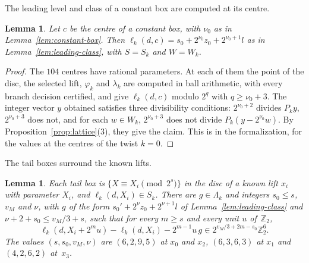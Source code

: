 \documentclass[11pt]{amsart}
\newtheorem{lemma}[theorem]{Lemma}
\theoremstyle{definition}
\numberwithin{equation}{section}
\newcommand{\Zt}{\mathbb{Z}_2}
\newcommand{\lean}[1]{\ignorespaces}
\begin{document}
The leading level and class of a constant box are computed at its centre.

\begin{lemma}\label{lem:centres}\lean{FurioLombardo.Discharge.M4Box.CentreData.hCe_0, FurioLombardo.M4.TwistChecks.centres, FurioLombardo.Discharge.M4Box.CentreData.hCe_1, FurioLombardo.M4.T0.centresMem, FurioLombardo.M4.T1.centresMem, FurioLombardo.Discharge.M4Box.lead_or_known_w}
Let $c$ be the centre of a constant box, with $\nu_0$ as in Lemma~\ref{lem:constant-box}. Then $\ell_k(d,c)=s_0+2^{\nu_0}z_0+2^{\nu_0+1}l$ as in Lemma~\ref{lem:leading-class}, with $S=S_k$ and $W=W_k$.
\end{lemma}

\begin{proof}
The $104$ centres have rational parameters. At each of them the point of the disc, the selected lift, $\varphi_k$ and $\lambda_k$ are computed in ball arithmetic, with every branch decision certified, and give $\ell_k(d,c)$ modulo $2^{q}$ with $q\ge\nu_0+3$. The integer vector $y$ obtained satisfies three divisibility conditions: $2^{\nu_0+2}$ divides $P_ky$, $2^{\nu_0+3}$ does not, and for each $w\in W_k$, $2^{\nu_0+3}$ does not divide $P_k(y-2^{\nu_0}w)$. By Proposition~\ref{prop:lattice}(3), they give the claim. This is  in the formalization, for the values at the centres of the twist $k=0$.
\end{proof}

The tail boxes surround the known lifts.

\begin{lemma}\label{lem:tail-box}\lean{FurioLombardo.Discharge.M4Box.hTailQuad_of_cert, FurioLombardo.Discharge.M4Box.BoxData.tailCert_0, FurioLombardo.Discharge.M4Box.BoxData.tailCert_1, FurioLombardo.M4.T0.checks, FurioLombardo.M4.T1.checks, FurioLombardo.Discharge.M4Box.hKnown_0, FurioLombardo.Discharge.M4Box.hKnown_1, FurioLombardo.Discharge.M4Box.logPhi_mem}
Each tail box is $\{X\equiv X_i\pmod{2^s}\}$ in the disc of a known lift $x_i$ with parameter $X_i$, and $\ell_k(d,X_i)\in S_k$. There are $g\in\Lambda_k$ and integers $s_0\le s$, $v_M$ and $\nu$, with $g$ of the form $s_0'+2^{\nu}z_0+2^{\nu+1}l$ of Lemma~\ref{lem:leading-class} and $\nu+2+s_0\le v_M/3+s$, such that for every $m\ge s$ and every unit $u$ of~$\Zt$,
\[
\ell_k(d,X_i+2^mu)-\ell_k(d,X_i)-2^{m-1}u\,g\in2^{v_M/3+2m-s_0}\Zt^6 .
\]
The values $(s,s_0,v_M,\nu)$ are $(6,2,9,5)$ at $x_0$ and $x_2$, $(6,3,6,3)$ at $x_1$ and $(4,2,6,2)$ at~$x_3$.
\end{lemma}
\end{document}
